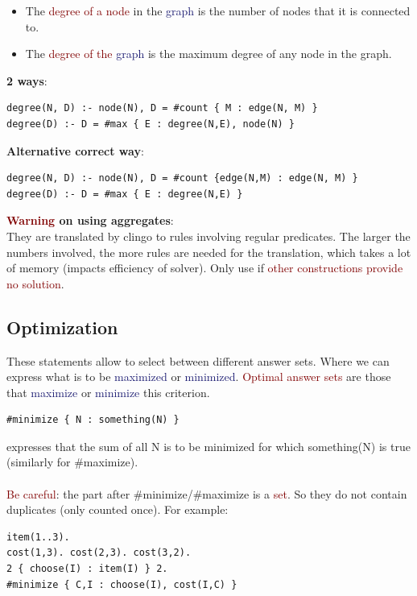 \begin{itemize}
    \item The \textcolor{Maroon}{degree of a node} in the \textcolor{MidnightBlue}{graph} is the number of nodes that it is connected to.
    \item The \textcolor{Maroon}{degree of the} \textcolor{MidnightBlue}{graph} is the maximum degree of any node in the graph.
\end{itemize}

\textbf{2 ways}: 
\begin{lstlisting}
degree(N, D) :- node(N), D = #count { M : edge(N, M) }
degree(D) :- D = #max { E : degree(N,E), node(N) }
\end{lstlisting}
\textbf{Alternative correct way}: 
\begin{lstlisting}
degree(N, D) :- node(N), D = #count {edge(N,M) : edge(N, M) }
degree(D) :- D = #max { E : degree(N,E) }
\end{lstlisting}

\newpage

\textbf{\textcolor{Maroon}{Warning} on using aggregates}: \\
They are translated by clingo to rules involving regular predicates. The larger the numbers involved, the more rules are needed for the translation, which takes a lot of memory (impacts efficiency of solver). Only use if \textcolor{Maroon}{other constructions provide no solution}.

\subsection*{Optimization}
These statements allow to select between different answer sets. Where we can express what is to be \textcolor{MidnightBlue}{maximized} or \textcolor{MidnightBlue}{minimized}. \textcolor{Maroon}{Optimal answer sets} are those that \textcolor{MidnightBlue}{maximize} or \textcolor{MidnightBlue}{minimize} this criterion.

\begin{lstlisting}
#minimize { N : something(N) }
\end{lstlisting}
expresses that the sum of all N is to be minimized for which something(N) is true (similarly for \#maximize).\\
\\
\textcolor{Maroon}{Be careful}: the part after \#minimize/\#maximize is a \textcolor{Maroon}{set}. So they do not contain duplicates (only counted once). For example:
\begin{lstlisting}
item(1..3).
cost(1,3). cost(2,3). cost(3,2).
2 { choose(I) : item(I) } 2.
#minimize { C,I : choose(I), cost(I,C) }
\end{lstlisting}


